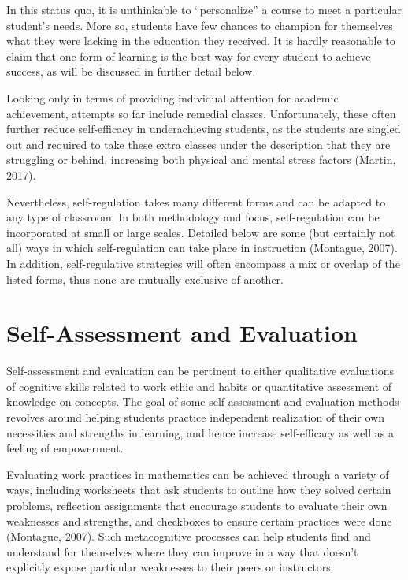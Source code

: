 In this status quo, it is unthinkable to ``personalize'' a course to meet a particular student's needs. More so, students have few chances to champion for themselves what they were lacking in the education they received. It is hardly reasonable to claim that one form of learning is the best way for every student to achieve success, as will be discussed in further detail below.

Looking only in terms of providing individual attention for academic achievement, attempts so far include remedial classes. Unfortunately, these often further reduce self-efficacy in underachieving students, as the students are singled out and required to take these extra classes under the description that they are struggling or behind, increasing both physical and mental stress factors (Martin, 2017).

Nevertheless, self-regulation takes many different forms and can be adapted to any type of classroom. In both methodology and focus, self-regulation can be incorporated at small or large scales. Detailed below are some (but certainly not all) ways in which self-regulation can take place in instruction (Montague, 2007). In addition, self-regulative strategies will often encompass a mix or overlap of the listed forms, thus none are mutually exclusive of another.

\section{Self-Assessment and Evaluation}
Self-assessment and evaluation can be pertinent to either qualitative evaluations of cognitive skills related to work ethic and habits or quantitative assessment of knowledge on concepts.
The goal of some self-assessment and evaluation methods revolves around helping students practice independent realization of their own necessities and strengths in learning, and hence increase self-efficacy as well as a feeling of empowerment.

Evaluating work practices in mathematics can be achieved through a variety of ways, including worksheets that ask students to outline how they solved certain problems, reflection assignments that encourage students to evaluate their own weaknesses and strengths, and checkboxes to ensure certain practices were done (Montague, 2007). Such metacognitive processes can help students find and understand for themselves where they can improve in a way that doesn't explicitly expose particular weaknesses to their peers or instructors.

